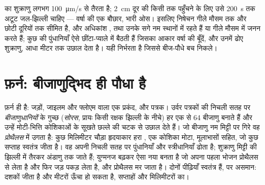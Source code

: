 \begin{example}[तैरते शुक्राणुओं की क़ीमत]\label{ex:b2:plant-life-cycles:sperm}
 का शुक्राणु लगभग \qty{100}{\micro m/s} से तैरता है; \qty{2}{cm}
दूर की किसी  तक पहुँचने के लिए उसे \qty{200}{s} तक अटूट
जल-झिल्ली चाहिए --- वर्षा की एक बौछार, भारी ओस। इसलिए निषेचन
गीले मौसम तक और छोटी दूरियों तक सीमित है, और अधिकांश
,  तथा उनके सगे नम स्थानों में रहते हैं या गीले मौसम में जनन
करते हैं; कुछ  की पुंधानियाँ ऐसे छींटा-प्याले में बैठती हैं जिसका
आकार वर्षा की बूँदें, और उनमें ढोए शुक्राणु, आधा मीटर तक उछाल देता है।
यही निर्भरता है जिससे बीज-पौधे बच निकले।
\end{example}

\section{फ़र्न: बीजाणुद्भिद ही पौधा है}

\begin{definition}[फ़र्न का जीवन-चक्र]\label{def:b2:plant-life-cycles:fern}
फ़र्न ही \emph{} है: जड़ों, जाइलम और फ्लोएम
वाला एक प्रकंद, और पत्रक। उर्वर पत्रकों की निचली सतह पर
\emph{बीजाणुधानियों} के गुच्छ (\emph{सोरस}, प्रायः किसी रक्षक झिल्ली के
नीचे) हर एक  से 64 बीजाणु बनाते हैं और उन्हें
मोटी-भित्ति कोशिकाओं के सूखते छल्ले की चटक से उछाल देते हैं। जो बीजाणु
नम मिट्टी पर गिरे वह \emph{प्रोथैलस} में उगता है: कुछ मिलिमीटर चौड़ा
हृदयाकार हरा , एक कोशिका मोटा, मूलाभासों सहित, जो कुछ
सप्ताह स्वतंत्र जीता है। वह अपनी निचली सतह पर पुंधानियाँ और
स्त्रीधानियाँ ढोता है; शुक्राणु मिट्टी की झिल्ली में तैरकर अंडाणु तक
जाते हैं; युग्मनज बढ़कर ऐसा नया  बनता है जो अपना पहला भोजन
प्रोथैलस से लेता है और फिर जड़ पकड़ लेता है, और प्रोथैलस मर जाता है।
दोनों पीढ़ियाँ स्वतंत्र हैं, पर असमान:  दशकों जीता है और
मीटरों ऊँचा हो सकता है,  सप्ताहों और मिलिमीटरों का।
\end{definition}

